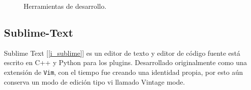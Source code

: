 \documentclass[12pt]{book} %
\begin{document}
		\begin{figure}[hbt]
			\centering
			\caption{Herramientas de desarrollo.}
		\end{figure}	
	\subsection{Sublime-Text \label{subl}}
		Sublime Text [\ref{i_sublime}] es un editor de texto y editor de código fuente está escrito en C++ y Python para los plugins. Desarrollado
		originalmente como una extensión de \texttt{Vim}, con el tiempo fue creando una identidad propia, por esto aún conserva un modo 
		de edición tipo vi llamado Vintage mode.\\
		
\end{document}
